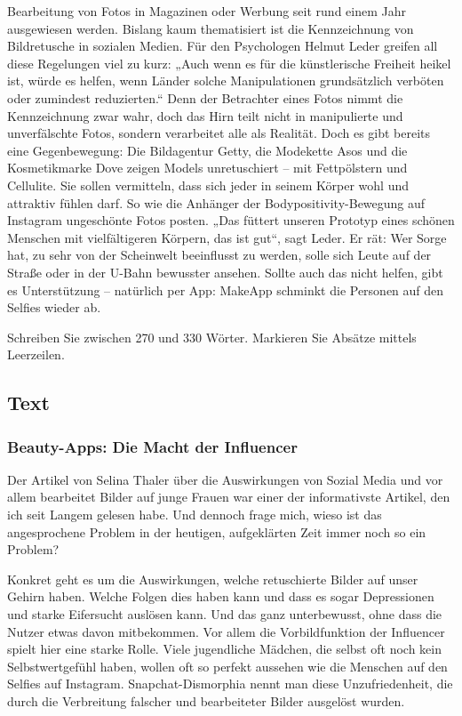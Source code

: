 Bearbeitung von Fotos in Magazinen oder Werbung seit rund
einem Jahr ausgewiesen werden.
Bislang kaum thematisiert ist die
Kennzeichnung von Bildretusche
in sozialen Medien. Für den Psychologen Helmut Leder greifen
all diese Regelungen viel zu kurz:
„Auch wenn es für die künstlerische Freiheit heikel ist, würde es
helfen, wenn Länder solche Manipulationen grundsätzlich verböten oder zumindest reduzierten.“
Denn der Betrachter eines Fotos
nimmt die Kennzeichnung zwar
wahr, doch das Hirn teilt nicht in
manipulierte und unverfälschte
Fotos, sondern verarbeitet alle als
Realität.
Doch es gibt bereits eine Gegenbewegung: Die Bildagentur Getty,
die Modekette Asos und die Kosmetikmarke Dove zeigen Models
unretuschiert  – mit Fettpölstern
und Cellulite. Sie sollen vermitteln, dass sich jeder in seinem
Körper wohl und attraktiv fühlen darf. So wie die Anhänger
der Bodypositivity-Bewegung
auf Instagram ungeschönte Fotos
posten. „Das füttert unseren Prototyp eines schönen Menschen
mit vielfältigeren Körpern, das
ist gut“, sagt Leder. Er rät: Wer
Sorge hat, zu sehr von der Scheinwelt beeinflusst zu werden, solle
sich Leute auf der Straße oder in
der U-Bahn bewusster ansehen.
Sollte auch das nicht helfen, gibt
es Unterstützung  – natürlich per
App: MakeApp schminkt die
Personen auf den Selfies wieder
ab.


Schreiben Sie zwischen 270 und 330 Wörter. Markieren Sie Absätze mittels Leerzeilen.

\subsection{Text}
\subsubsection{Beauty-Apps: Die Macht der Influencer }

Der Artikel von Selina Thaler über die Auswirkungen von Sozial Media und vor allem bearbeitet Bilder auf junge Frauen war einer der informativste Artikel, den ich seit Langem gelesen habe. Und dennoch frage mich, wieso ist das angesprochene Problem in der heutigen, aufgeklärten Zeit immer noch so ein Problem? 

Konkret geht es um die Auswirkungen, welche retuschierte Bilder auf unser Gehirn haben. Welche Folgen dies haben kann und dass es sogar Depressionen und starke Eifersucht auslösen kann. Und das ganz unterbewusst, ohne dass die Nutzer etwas davon mitbekommen. Vor allem die Vorbildfunktion der Influencer spielt hier eine starke Rolle. Viele jugendliche Mädchen, die selbst oft noch kein Selbstwertgefühl haben, wollen oft so perfekt aussehen wie die Menschen auf den Selfies auf Instagram. Snapchat-Dismorphia nennt man diese Unzufriedenheit, die durch die Verbreitung falscher und bearbeiteter Bilder ausgelöst wurden. 

